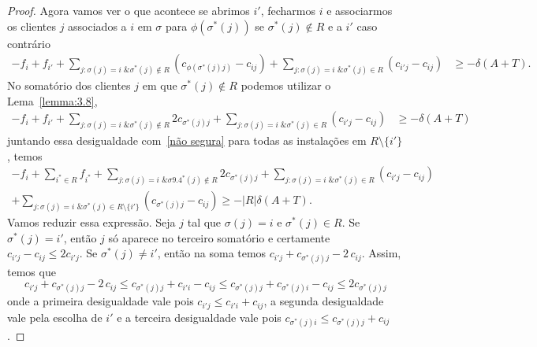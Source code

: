 \begin{proof}
    Agora vamos ver o que acontece se abrimos $i'$, fecharmos $i$ e associarmos os clientes $j$ associados a $i$ em $\sigma$ para $\phi(\sigma^*(j))$ se $\sigma^*(j) \not \in R$ e a $i'$ caso contrário
    \begin{align*}
        - f_i + f_{i'} + \sum_{j: \sigma(j) = i \text{ \& } \sigma^*(j)\not \in R}(c_{\phi(\sigma^*(j)j)} - c_{ij}) + \sum_{j: \sigma(j)=i \text{ \& }\sigma^*(j) \in R}(c_{i'j} - c_{ij}) &\geq -\delta(A+T).
    \end{align*}
    No somatório dos clientes $j$ em que $\sigma^*(j) \not \in R$ podemos utilizar o Lema~\ref{lemma:3.8},
    \begin{align*}
        - f_i + f_{i'} + \sum_{j: \sigma(j) = i \text{ \& } \sigma^*(j)\not \in R} 2c_{\sigma^*(j)j} + \sum_{j: \sigma(j)=i \text{ \& }\sigma^*(j) \in R}(c_{i'j} - c_{ij}) &\geq -\delta(A+T)
    \end{align*}
    juntando essa desigualdade com~\eqref{não segura} para todas as instalações em $R\setminus\{i'\}$, temos
    \begin{align*}
        -f_i + \sum_{i^* \in R}f_{i^*} + \sum_{j: \sigma(j) = i \text{ \& } \sigma9.4^*(j)\not \in R} 2c_{\sigma^*(j)j} + \sum_{j: \sigma(j)=i \text{ \& }\sigma^*(j) \in R}(c_{i'j} - c_{ij}) \\+ \sum_{j:\sigma(j)=i \text{ \& }\sigma^*(j) \in R \setminus\{i'\}}(c_{\sigma^*(j)j} - c_{ij}) \geq -|R|\delta(A+T).
    \end{align*}
    Vamos reduzir essa expressão. Seja $j$ tal que $\sigma(j)=i$ e $\sigma^*(j) \in R$. 
    Se $\sigma^*(j) = i'$, então $j$ só aparece no terceiro somatório e certamente $c_{i'j} - c_{ij} \leq 2 c_{i'j}$. 
    Se $\sigma^*(j)\neq i'$, então na soma temos $c_{i'j} + c_{\sigma^*(j)j} - 2 \,c_{ij}$. Assim, temos que
    \[
            c_{i'j} + c_{\sigma^*(j)j} - 2 \,c_{ij} \leq 
            c_{\sigma^*(j)j} + c_{i'i} - c_{ij} \leq
            c_{\sigma^*(j)j} + c_{\sigma^*(j)i} - c_{ij} \leq
            2 c_{\sigma^*(j)j}
    \]
    onde a primeira desigualdade vale pois $c_{i'j} \leq c_{i'i} + c_{ij}$, a segunda desigualdade vale pela escolha de $i'$ e a terceira desigualdade vale pois $c_{\sigma^*(j)i} \leq c_{\sigma^*(j)j} + c_{ij}$.


\end{proof}
